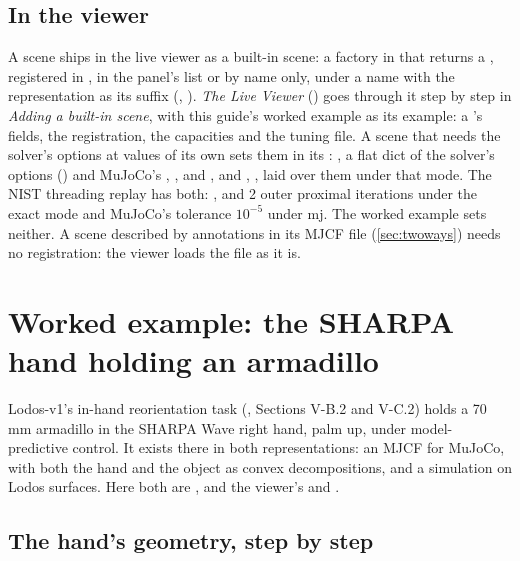 \subsection{In the viewer}\label{sec:register}

A scene ships in the live viewer as a built-in scene: a factory in  that returns a , registered in , in the panel's list or by name only, under a name with the representation as its suffix (, ). \emph{The Live Viewer} () goes through it step by step in \emph{Adding a built-in scene}, with this guide's worked example as its example: a 's fields, the registration, the capacities and the tuning file. A scene that needs the solver's options at values of its own sets them in its : , a flat dict of the solver's options () and MuJoCo's , ,  and , and , , laid over them under that mode. The NIST threading replay has both: , and 2 outer proximal iterations under the exact mode and MuJoCo's tolerance $10^{-5}$ under mj. The worked example sets neither. A scene described by  annotations in its MJCF file (\cref{sec:twoways}) needs no registration: the viewer loads the file as it is.

\section{Worked example: the SHARPA hand holding an armadillo}\label{sec:example}

Lodos-v1's in-hand reorientation task (, Sections V-B.2 and V-C.2) holds a 70\,mm armadillo in the SHARPA Wave right hand, palm up, under model-predictive control. It exists there in both representations: an MJCF for MuJoCo, with both the hand and the object as convex decompositions, and a simulation on Lodos surfaces. Here both are , and the viewer's  and .

\subsection{The hand's geometry, step by step}\label{sec:exmesh}

